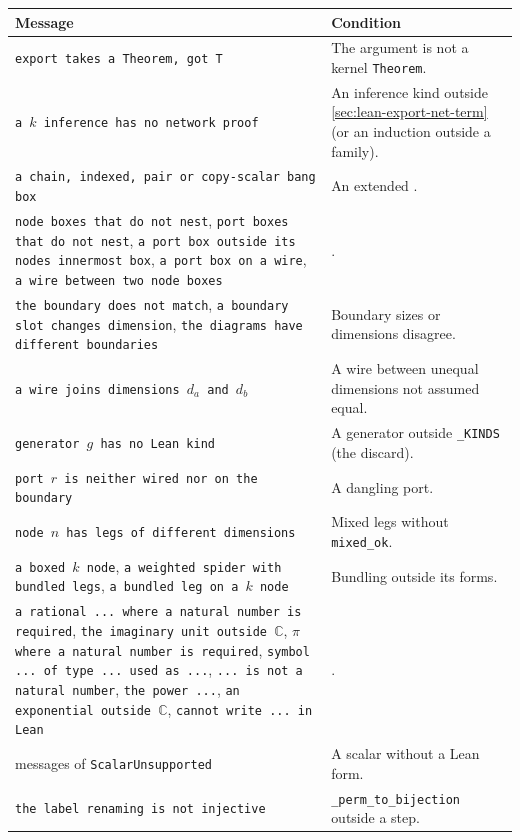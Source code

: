 {\begin{xltabular}{\linewidth}{@{}p{6.4cm}X@{}}
\toprule
Message & Condition \\
\midrule
\texttt{export takes a Theorem, got T} & The argument is not a kernel \texttt{Theorem}. \\
\texttt{a }$k$\texttt{ inference has no network proof} & An inference kind outside
  \cref{sec:lean-export-net-term} (or an induction outside a family). \\
\texttt{a chain, indexed, pair or copy-scalar bang box} & An extended \bbox{}. \\
\texttt{node boxes that do not nest}, \texttt{port boxes that do not nest},
  \texttt{a port box outside its node\textquotesingle{}s innermost box}, \texttt{a port box on a wire},
  \texttt{a wire between two node boxes} & . \\
\texttt{the boundary does not match}, \texttt{a boundary slot changes dimension},
  \texttt{the diagrams have different boundaries} & Boundary sizes or dimensions disagree. \\
\texttt{a wire joins dimensions }$d_a$\texttt{ and }$d_b$ & A wire between unequal dimensions not
  assumed equal. \\
\texttt{generator }$g$\texttt{ has no Lean kind} & A generator outside \texttt{\_\allowbreak{}KINDS} (the discard). \\
\texttt{port }$r$\texttt{ is neither wired nor on the boundary} & A dangling port. \\
\texttt{node }$n$\texttt{ has legs of different dimensions} & Mixed legs without \texttt{mixed\_\allowbreak{}ok}. \\
\texttt{a boxed }$k$\texttt{ node}, \texttt{a weighted spider with bundled legs},
  \texttt{a bundled leg on a }$k$\texttt{ node} & Bundling outside its forms. \\
\texttt{a rational ... where a natural number is required}, \texttt{the imaginary unit outside $\mathbb{C}$},
  \texttt{$\pi$ where a natural number is required}, \texttt{symbol ... of type ... used as ...},
  \texttt{... is not a natural number}, \texttt{the power ...}, \texttt{an exponential outside $\mathbb{C}$},
  \texttt{cannot write ... in Lean} & . \\
messages of \texttt{ScalarUnsupported} & A scalar without a Lean form. \\
\texttt{the label renaming is not injective} & \texttt{\_\allowbreak{}perm\_\allowbreak{}to\_\allowbreak{}bijection} outside a step. \\

\end{xltabular}}
